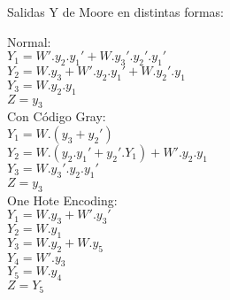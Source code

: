 \documentclass[10pt,a4paper]{article}
\begin{document}
Salidas Y de Moore en distintas formas:

Normal:\\
$Y_1 = W' . y_2 . y_1' + W . y_3' . y_2' . y_1'$\\
$Y_2 = W . y_3 + W' . y_2 . y_1' + W . y_2' . y_1$\\
$Y_3 = W . y_2 . y_1$\\
$Z = y_3$\\

Con Código Gray:\\
$Y_1 = W . (y_3 + y_2')$\\
$Y_2 = W . (y_2 . y_1' + y_2' . Y_1) + W' . y_2 . y_1$\\
$Y_3 = W . y_3' . y_2 . y_1'$\\
$Z = y_3$\\

One Hote Encoding:\\
$Y_1 = W . y_3 + W' . y_3'$\\
$Y_2 = W . y_1$\\
$Y_3 = W . y_2 + W . y_5$\\
$Y_4 = W' . y_3$\\
$Y_5 = W . y_4$\\
$Z = Y_5$\\
\end{document}
